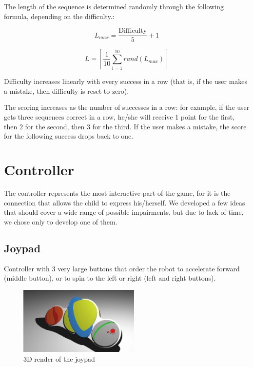 \documentclass[a4paper,twoside]{book}
\begin{document}
\begin{description}
The length of the sequence is determined randomly through the following formula, depending on the difficulty.:

\[L_{max} = \frac{\mathrm{Difficulty}}{5}+1\]

\[L = \left \lceil \frac{1}{10}\sum_{i=1}^{10} rand\left(L_{max}\right) \right \rceil\]

Difficulty increases linearly with every success in a row (that is, if the user makes a mistake, then difficulty is reset to zero).

The scoring increases as the number of successes in a row: for example, if the user gets three sequences correct in a row, he/she will receive 1 point for the first, then 2 for the second, then 3 for the third. If the user makes a mistake, the score for the following success drops back to one.
\end{description}

\section{Controller}

The controller represents the most interactive part of the game, for it is the connection that allows the child to express his/herself.
We developed a few ideas that should cover a wide range of possible impairments, but due to lack of time, we chose only to develop one of them.

\subsection{Joypad}
Controller with 3 very large buttons that order the robot to accelerate forward (middle button), or to spin to the left or right (left and right buttons).

\begin{figure}
 \includegraphics[width=6cm]{img/controller.eps}
 \caption{3D render of the joypad}
\end{figure}
\end{document}
